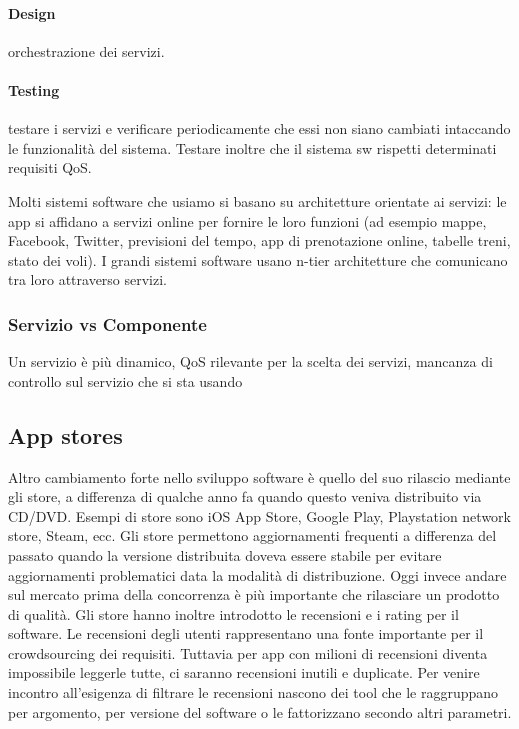 \documentclass[10pt,a4paper]{book}
\begin{document}
\paragraph{Design} orchestrazione dei servizi.
\paragraph{Testing} testare i servizi e verificare periodicamente che essi non siano cambiati intaccando le funzionalità del sistema. Testare inoltre che il sistema sw rispetti determinati requisiti QoS.

Molti sistemi software che usiamo si basano su architetture orientate ai servizi: le app si affidano a servizi online per fornire le loro funzioni (ad esempio mappe, Facebook, Twitter, previsioni del tempo, app di prenotazione online, tabelle treni, stato dei voli).
I grandi sistemi software usano n-tier architetture che comunicano tra loro attraverso servizi.

\subsubsection{Servizio vs Componente}
Un servizio è più dinamico, QoS rilevante per la scelta dei servizi, mancanza di controllo sul servizio che si sta usando

\subsection{App stores}
Altro cambiamento forte nello sviluppo software è quello del suo rilascio mediante gli store, a differenza di qualche anno fa quando questo veniva distribuito via CD/DVD.
Esempi di store sono iOS App Store, Google Play, Playstation network store, Steam, ecc.
Gli store permettono aggiornamenti frequenti a differenza del passato quando la versione distribuita doveva essere stabile per evitare aggiornamenti problematici data la modalità di distribuzione.
Oggi invece andare sul mercato prima della concorrenza è più importante che rilasciare un prodotto di qualità.
Gli store hanno inoltre introdotto le recensioni e i rating per il software. Le recensioni degli utenti rappresentano una fonte importante per il crowdsourcing dei requisiti.
Tuttavia per app con milioni di recensioni diventa impossibile leggerle tutte, ci saranno recensioni inutili e duplicate. Per venire incontro all'esigenza di filtrare le recensioni nascono dei tool che le raggruppano per argomento, per versione del software o le fattorizzano secondo altri parametri.
\end{document}
